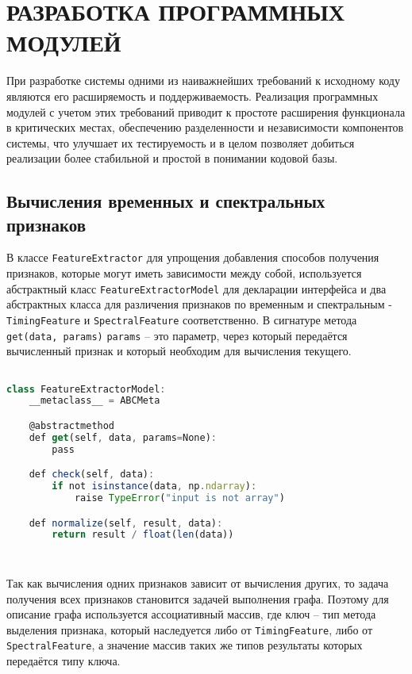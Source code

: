 \section{РАЗРАБОТКА ПРОГРАММНЫХ МОДУЛЕЙ}
\label{sec:dev}

При разработке системы одними из наиважнейших требований к исходному коду являются его расширяемость и поддерживаемость. Реализация программных модулей с учетом этих требований приводит к простоте расширения функционала в критических местах, обеспечению разделенности и независимости компонентов системы, что улучшает их тестируемость и в целом позволяет добиться реализации более стабильной и простой в понимании кодовой базы.

\subsection{Вычисления временных и спектральных признаков}

В классе \texttt{FeatureExtractor} для упрощения добавления способов получения признаков, которые могут иметь зависимости между собой, используется абстрактный класс \texttt{FeatureExtractorModel} для декларации интерфейса и два абстрактных класса для различения признаков по временным и спектральным - \texttt{TimingFeature} и \texttt{SpectralFeature} соответственно. В сигнатуре  метода \texttt{get(data, params)}  \texttt{params} -- это параметр, через который передаётся вычисленный признак и который необходим для вычисления текущего.
 
\begin{lstlisting}[language=TypeScript, label=lst:abstract]

class FeatureExtractorModel:
    __metaclass__ = ABCMeta

    @abstractmethod
    def get(self, data, params=None):
        pass

    def check(self, data):
        if not isinstance(data, np.ndarray):
            raise TypeError("input is not array")

    def normalize(self, result, data):
        return result / float(len(data))
       
        
\end{lstlisting}

Так как вычисления одних признаков зависит от вычисления других, то задача получения всех признаков становится задачей выполнения графа. Поэтому для описание графа используется ассоциативный массив, где ключ -- тип метода выделения признака, который наследуется либо от \texttt{TimingFeature}, либо от  \texttt{SpectralFeature}, а значение массив таких же типов результаты которых передаётся типу ключа.

